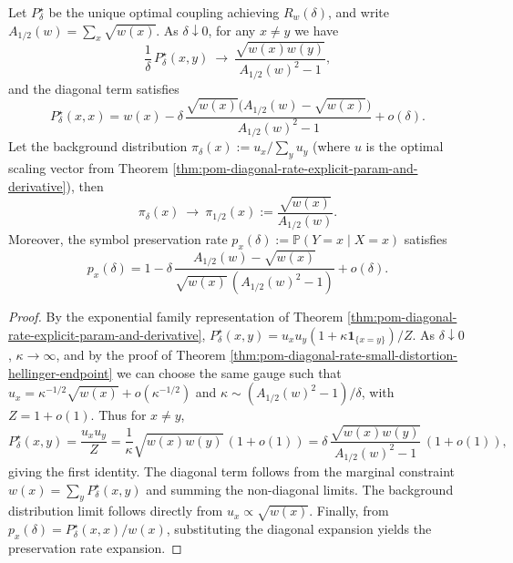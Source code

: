 \begin{theorem}\label{thm:pom-diagonal-rate-rare-mismatch-hellinger-universality}
Let \(P^\star_\delta\) be the unique optimal coupling achieving \(R_w(\delta)\), and write \(A_{1/2}(w)=\sum_x\sqrt{w(x)}\).
As \(\delta\downarrow 0\), for any \(x\ne y\) we have
\[
\frac{1}{\delta}\,P^\star_\delta(x,y)\ \longrightarrow\ \frac{\sqrt{w(x)w(y)}}{A_{1/2}(w)^2-1},
\]
and the diagonal term satisfies
\[
P^\star_\delta(x,x)
=w(x)-\delta\,\frac{\sqrt{w(x)}\bigl(A_{1/2}(w)-\sqrt{w(x)}\bigr)}{A_{1/2}(w)^2-1}+o(\delta).
\]
Let the background distribution
\(
\pi_\delta(x):=u_x/\sum_y u_y
\)
(where \(u\) is the optimal scaling vector from Theorem \ref{thm:pom-diagonal-rate-explicit-param-and-derivative}), then
\[
\pi_\delta(x)\ \longrightarrow\ \pi_{1/2}(x):=\frac{\sqrt{w(x)}}{A_{1/2}(w)}.
\]
Moreover, the symbol preservation rate \(p_x(\delta):=\mathbb P(Y=x\mid X=x)\) satisfies
\[
p_x(\delta)
=1-\delta\,\frac{A_{1/2}(w)-\sqrt{w(x)}}{\sqrt{w(x)}\,(A_{1/2}(w)^2-1)}+o(\delta).
\]
\end{theorem}
\begin{proof}
By the exponential family representation of Theorem \ref{thm:pom-diagonal-rate-explicit-param-and-derivative}, \(P^\star_\delta(x,y)=u_xu_y(1+\kappa\mathbf 1_{\{x=y\}})/Z\).
As \(\delta\downarrow 0\), \(\kappa\to\infty\), and by the proof of Theorem \ref{thm:pom-diagonal-rate-small-distortion-hellinger-endpoint} we can choose the same gauge such that
\(
u_x=\kappa^{-1/2}\sqrt{w(x)}+o(\kappa^{-1/2})
\)
and
\(
\kappa\sim (A_{1/2}(w)^2-1)/\delta
\),
with \(Z=1+o(1)\).
Thus for \(x\ne y\),
\[
P^\star_\delta(x,y)=\frac{u_xu_y}{Z}
=\frac{1}{\kappa}\sqrt{w(x)w(y)}\,(1+o(1))
=\delta\,\frac{\sqrt{w(x)w(y)}}{A_{1/2}(w)^2-1}\,(1+o(1)),
\]
giving the first identity.
The diagonal term follows from the marginal constraint
\(
w(x)=\sum_y P^\star_\delta(x,y)
\)
and summing the non-diagonal limits.
The background distribution limit follows directly from \(u_x\propto \sqrt{w(x)}\).
Finally, from
\(
p_x(\delta)=P^\star_\delta(x,x)/w(x)
\),
substituting the diagonal expansion yields the preservation rate expansion.
\end{proof}



